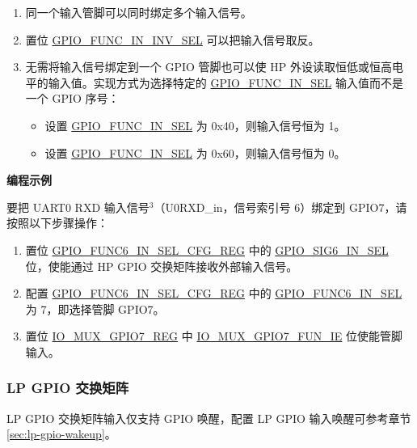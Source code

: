 \documentclass[main\_\_CN.tex]{subfiles}
\begin{document}
\begin{tiplisting}
\vspace{-2em}
\begin{enumerate}
\item \label{input-note-1} 同一个输入管脚可以同时绑定多个输入信号。
\item \label{input-note-2} 置位 \hyperref[fielddesc:GPIOFUNCNININVSEL]{GPIO\_FUNC\_IN\_INV\_SEL} 可以把输入信号取反。
\item \label{input-note-3}无需将输入信号绑定到一个 GPIO 管脚也可以使 HP 外设读取恒低或恒高电平的输入值。实现方式为选择特定的 \hyperref[fielddesc:GPIOFUNCMINSEL]{GPIO\_FUNC\_IN\_SEL} 输入值而不是一个 GPIO 序号：
\begin {itemize}
\item 设置 \hyperref[fielddesc:GPIOFUNCMINSEL]{GPIO\_FUNC\_IN\_SEL} 为 0x40，则输入信号恒为 1。
\item 设置 \hyperref[fielddesc:GPIOFUNCMINSEL]{GPIO\_FUNC\_IN\_SEL} 为 0x60，则输入信号恒为 0。
\end{itemize}
\end{enumerate}
\end{tiplisting}

\textbf{编程示例}

要把 UART0 RXD 输入信号\hyperref[input-note-3]{$^3$}（U0RXD\_in，信号索引号 6）绑定到 GPIO7，请按照以下步骤操作：
\begin{enumerate}
\item 置位 \hyperref[regdesc:GPIOFUNCMINSELCFGREG]{GPIO\_FUNC6\_IN\_SEL\_CFG\_REG} 中的 \hyperref[fielddesc:GPIOSIGNINSEL]{GPIO\_SIG6\_IN\_SEL} 位，使能通过 HP GPIO 交换矩阵接收外部输入信号。
\item 配置 \hyperref[regdesc:GPIOFUNCMINSELCFGREG]{GPIO\_FUNC6\_IN\_SEL\_CFG\_REG} 中的 \hyperref[fielddesc:GPIOFUNCMINSEL]{GPIO\_FUNC6\_IN\_SEL} 为 7，即选择管脚 GPIO7。
\item 置位 \hyperref[regdesc:IOMUXGPIONREG]{IO\_MUX\_GPIO7\_REG} 中 \hyperref[fielddesc:IOMUXGPIONFUNIE]{IO\_MUX\_GPIO7\_FUN\_IE} 位使能管脚输入。
\end{enumerate}

\subsubsection{LP GPIO 交换矩阵}

LP GPIO 交换矩阵输入仅支持 GPIO 唤醒，配置 LP GPIO 输入唤醒可参考章节 \ref{sec:lp-gpio-wakeup}。
\end{document}
